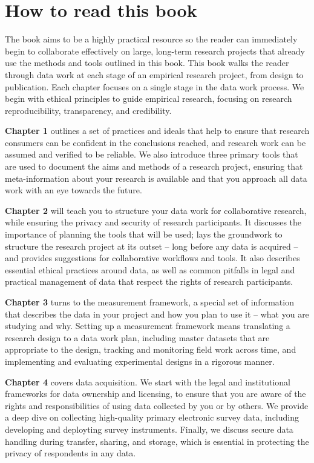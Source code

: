 
\section{How to read this book}

The book aims to be a highly practical resource so the reader can
immediately begin to collaborate effectively on large, long-term research projects
that already use the methods and tools outlined in this book.
This book walks the reader through data work at each stage
of an empirical research project, from design to publication.
Each chapter focuses on a single stage in the data work process.
We begin with ethical principles to guide empirical research,
focusing on research reproducibility, transparency, and credibility.

\textbf{Chapter 1} outlines a set of practices and ideals that help to ensure that
research consumers can be confident in the conclusions reached,
and research work can be assumed and verified to be reliable.
We also introduce three primary tools that are used to document
the aims and methods of a research project,
ensuring that meta-information about your research is available
and that you approach all data work with an eye towards the future.

\textbf{Chapter 2} will teach you to structure your data work for collaborative research,
while ensuring the privacy and security of research participants.
It discusses the importance of planning the tools that will be used;
lays the groundwork to structure the research project at its outset --
long before any data is acquired --
and provides suggestions for collaborative workflows and tools.
It also describes essential ethical practices around data,
as well as common pitfalls in legal and practical management of data
that respect the rights of research participants.

\textbf{Chapter 3} turns to the measurement framework,
a special set of information that describes the data in your project
and how you plan to use it -- what you are studying and why.
Setting up a measurement framework means translating a research design to a data work plan,
including master datasets that are appropriate to the design,
tracking and monitoring field work across time,
and implementing and evaluating experimental designs in a rigorous manner.

\textbf{Chapter 4} covers data acquisition. We start with
the legal and institutional frameworks for data ownership and licensing,
to ensure that you are aware of the rights and responsibilities
of using data collected by you or by others.
We provide a deep dive on collecting high-quality primary electronic survey data,
including developing and deployting survey instruments.
Finally, we discuss secure data handling during transfer, sharing, and storage,
which is essential in protecting the privacy of respondents in any data.


